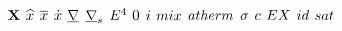 \begin{mdframed}
$\matrx$ \newline
$\intscal$ \newline
$\partmol$ \newline
$\tderiv$ \newline
$\gradop$ \newline
$\surfgradop$ \newline
$\axbiop$ \newline
$\init$ \newline
$\state$ \newline
$\mixfunc$ \newline
$\atfunc$ \newline
$\bound$ \newline
$\crit$ \newline
$\exfunc$ \newline
$\idgas$ \newline
$\satvap$ \newline

\end{mdframed}
